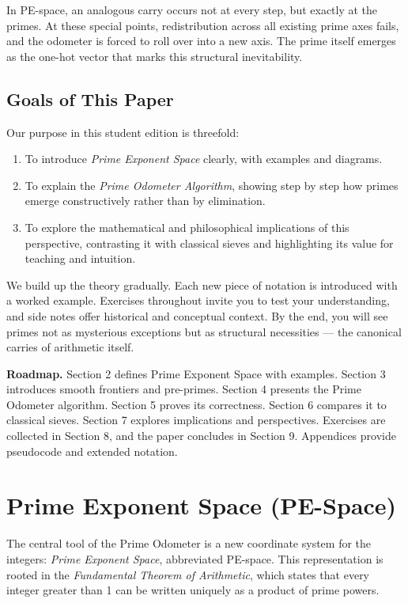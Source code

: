 \documentclass[11pt]{article}
\theoremstyle{definition}
\begin{document}
In PE-space, an analogous carry occurs not at every step, but exactly at the primes. 
At these special points, redistribution across all existing prime axes fails, and the odometer 
is forced to roll over into a new axis. The prime itself emerges as the one-hot vector 
that marks this structural inevitability. 

\subsection*{Goals of This Paper}
Our purpose in this student edition is threefold:
\begin{enumerate}
  \item To introduce \emph{Prime Exponent Space} clearly, with examples and diagrams.
  \item To explain the \emph{Prime Odometer Algorithm}, showing step by step how primes 
        emerge constructively rather than by elimination.
  \item To explore the mathematical and philosophical implications of this perspective, 
        contrasting it with classical sieves and highlighting its value for teaching and intuition.
\end{enumerate}

We build up the theory gradually. Each new piece of notation is introduced with a worked example. 
Exercises throughout invite you to test your understanding, and side notes offer historical 
and conceptual context. By the end, you will see primes not as mysterious exceptions but as 
structural necessities --- the canonical carries of arithmetic itself. 

\begin{studentnote}
\textbf{Roadmap.} 
Section 2 defines Prime Exponent Space with examples.  
Section 3 introduces smooth frontiers and pre-primes.  
Section 4 presents the Prime Odometer algorithm.  
Section 5 proves its correctness.  
Section 6 compares it to classical sieves.  
Section 7 explores implications and perspectives.  
Exercises are collected in Section 8, and the paper concludes in Section 9.  
Appendices provide pseudocode and extended notation.
\end{studentnote}

\section{Prime Exponent Space (PE-Space)}

The central tool of the Prime Odometer is a new coordinate system for the integers: 
\emph{Prime Exponent Space}, abbreviated PE-space. 
This representation is rooted in the \emph{Fundamental Theorem of Arithmetic}, which states 
that every integer greater than 1 can be written uniquely as a product of prime powers.
\end{document}
